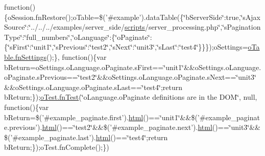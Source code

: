 \begin{DoxyCompactItemize}
function()\{o\+Session.\+fn\+Restore();o\+Table=\$('\#example').data\+Table(\{\char`\"{}b\+Server\+Side\char`\"{}\+:true,\char`\"{}s\+Ajax\+Source\char`\"{}\+:\char`\"{}../../../examples/server\+\_\+side/\hyperlink{tinymce_8jquery_8dev_8js_a09066d4d580eeec222f858d588b4cdef}{scripts}/server\+\_\+processing.\+php\char`\"{},\char`\"{}s\+Pagination\+Type\char`\"{}\+:\char`\"{}full\+\_\+numbers\char`\"{},\char`\"{}o\+Language\char`\"{}\+:\{\char`\"{}o\+Paginate\char`\"{}\+:\{\char`\"{}s\+First\char`\"{}\+:\char`\"{}unit1\char`\"{},\char`\"{}s\+Previous\char`\"{}\+:\char`\"{}test2\char`\"{},\char`\"{}s\+Next\char`\"{}\+:\char`\"{}unit3\char`\"{},\char`\"{}s\+Last\char`\"{}\+:\char`\"{}test4\char`\"{}\}\}\});o\+Settings=\hyperlink{api_8methods_8js_a78f387fab92a85c2cb7830bc5d8a6141}{o\+Table.\+fn\+Settings}();\}, function()\{var b\+Return=o\+Settings.\+o\+Language.\+o\+Paginate.\+s\+First==\char`\"{}unit1\char`\"{}\&\&o\+Settings.\+o\+Language.\+o\+Paginate.\+s\+Previous==\char`\"{}test2\char`\"{}\&\&o\+Settings.\+o\+Language.\+o\+Paginate.\+s\+Next==\char`\"{}unit3\char`\"{}\&\&o\+Settings.\+o\+Language.\+o\+Paginate.\+s\+Last==\char`\"{}test4\char`\"{};return b\+Return;\});\hyperlink{__zero__config__objects__subarrays_8js_a7f100cfe8617a03cd30c47b5e15396a4}{o\+Test.\+fn\+Test}(\char`\"{}o\+Language.\+o\+Paginate definitions are in the D\+O\+M\char`\"{}, null, function()\{var b\+Return=\$('\#example\+\_\+paginate.\+first').\hyperlink{tinymce_8jquery_8dev_8js_ac2090bcf2ff968c0083d5de53a6544f3}{html}()==\char`\"{}unit1\char`\"{}\&\&\$('\#example\+\_\+paginate.\+previous').\hyperlink{tinymce_8jquery_8dev_8js_ac2090bcf2ff968c0083d5de53a6544f3}{html}()==\char`\"{}test2\char`\"{}\&\&\$('\#example\+\_\+paginate.\+next').\hyperlink{tinymce_8jquery_8dev_8js_ac2090bcf2ff968c0083d5de53a6544f3}{html}()==\char`\"{}unit3\char`\"{}\&\&\$('\#example\+\_\+paginate.\+last').\hyperlink{tinymce_8jquery_8dev_8js_ac2090bcf2ff968c0083d5de53a6544f3}{html}()==\char`\"{}test4\char`\"{};return b\+Return;\});o\+Test.\+fn\+Complete();\})
\end{DoxyCompactItemize}


